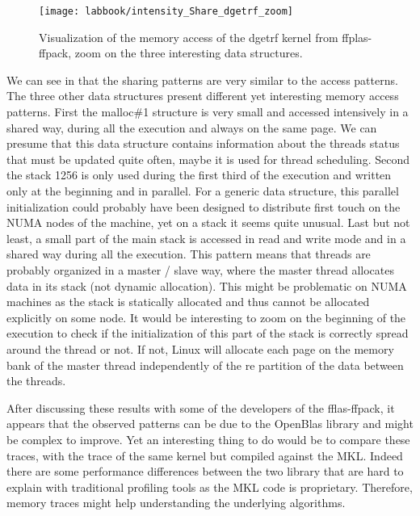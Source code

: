 \begin{figure}[htb]
    \centering
    \texttt{[image: labbook/intensity\_Share\_dgetrf\_zoom]}
    \caption{Visualization of the memory access of the dgetrf kernel from ffplas-ffpack, zoom on the three interesting data structures.}
    \label{fig:dgetrf-share-zoom}
\end{figure}

We can see in  that the sharing patterns are very similar to the access patterns.
The three other data structures present different yet interesting memory access patterns.
First the malloc\#1 structure is very small and accessed intensively in a shared way, during all the execution and always on the same page.
We can presume that this data structure contains information about the threads status that must be updated quite often, maybe it is used for thread scheduling.
Second the stack 1256 is only used during the first third of the execution and written only at the beginning and in parallel.
For a generic data structure, this parallel initialization could probably have been designed to distribute first touch on the \gls{NUMA} nodes of the machine, yet on a stack it seems quite unusual.
Last but not least, a small part of the main stack is accessed in read and write mode and in a shared way during all the execution.
This pattern means that threads are probably organized in a master / slave way, where the master thread allocates data in its stack (not dynamic allocation).
This might be problematic on \gls{NUMA} machines as the stack is statically allocated and thus cannot be allocated explicitly on some node.
It would be interesting to zoom on the beginning of the execution to check if the initialization of this part of the stack is correctly spread around the thread or not.
If not, Linux will allocate each page on the memory bank of the master thread independently of the re partition of the data between the threads.

After discussing these results with some of the developers of the fflas-ffpack, it appears that the observed patterns can be due to the OpenBlas library and might be complex to improve.
Yet an interesting thing to do would be to compare these traces, with the trace of the same kernel but compiled against the \gls{MKL}.
Indeed there are some performance differences between the two library that are hard to explain with traditional profiling tools as the \gls{MKL} code is proprietary.
Therefore, memory traces might help understanding the underlying algorithms.

